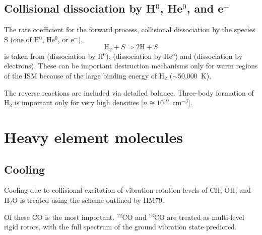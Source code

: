 \subsection{Collisional dissociation by H$^0$, He$^0$, and e$^-$}

The rate coefficient for the forward process, collisional dissociation
by the species S (one of H$^0$, He$^0$, or e$^-$),
\begin{equation}
{{\mathrm{H}}_2} + S \Rightarrow 2{\mathrm{H}} + S
\end{equation}
is taken from \citet{Dove1986} (dissociation by H$^0$),
\citet{Dove1987} (dissociation by He$^o$) and \citet{Janev1987} (dissociation by electrons).
These can be important destruction mechanisms only for warm regions of the
ISM because of the large binding energy of H$_2$ ($\sim$50,000~K).

The reverse reactions are included via detailed balance. Three-body
formation of H$_2$ is important only for very high densities [$n\cong
10^{10}$~cm$^{-3}$].

\section{Heavy element molecules}

\subsection{Cooling}

Cooling due to collisional excitation of vibration-rotation levels of
CH, OH, and H$_2$O is treated using the scheme outlined by HM79.

Of these CO is the most important. $^{12}$CO and $^{13}$CO are treated as
multi-level rigid rotors, with the full spectrum of the ground vibration
state predicted.


